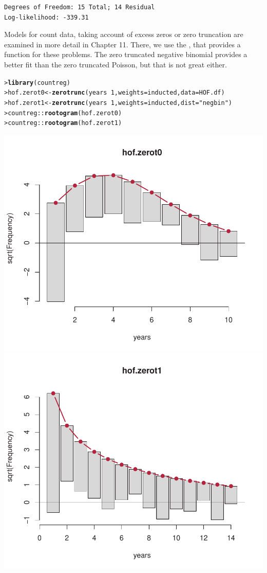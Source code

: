 \documentclass[10pt]{report}\usepackage[]{graphicx}\usepackage[]{color}
\makeatletter
\newcommand{\hlnum}[1]{\textcolor[rgb]{0.686,0.059,0.569}{#1}}%
\newcommand{\hlstr}[1]{\textcolor[rgb]{0.192,0.494,0.8}{#1}}%
\newcommand{\hlopt}[1]{\textcolor[rgb]{0,0,0}{#1}}%
\newcommand{\hlstd}[1]{\textcolor[rgb]{0.345,0.345,0.345}{#1}}%
\newcommand{\hlkwb}[1]{\textcolor[rgb]{0.69,0.353,0.396}{#1}}%
\newcommand{\hlkwc}[1]{\textcolor[rgb]{0.333,0.667,0.333}{#1}}%
\newcommand{\hlkwd}[1]{\textcolor[rgb]{0.737,0.353,0.396}{\textbf{#1}}}%
\newenvironment{kframe}{%
 \def\at@end@of@kframe{}%
 \ifinner\ifhmode%
  \def\at@end@of@kframe{\end{minipage}}%
  \begin{minipage}{\columnwidth}%
 \fi\fi%
 \def\FrameCommand##1{\hskip\@totalleftmargin \hskip-\fboxsep
 \colorbox{shadecolor}{##1}\hskip-\fboxsep
     \hskip-\linewidth \hskip-\@totalleftmargin \hskip\columnwidth}%
 \MakeFramed {\advance\hsize-\width
   \@totalleftmargin\z@ \linewidth\hsize
   \@setminipage}}%
 {\par\unskip\endMakeFramed%
 \at@end@of@kframe}
\newenvironment{knitrout}{}{} %
\renewenvironment{knitrout}{\small\renewcommand{\baselinestretch}{.85}}{} %
\makeatother
\begin{document}
\begin{Exercises}
\begin{enumerate*}
\begin{ans}
\begin{knitrout}
\begin{kframe}
\begin{verbatim}
Degrees of Freedom: 15 Total; 14 Residual
Log-likelihood: -339.31 
\end{verbatim}
\end{kframe}
\end{knitrout}
      Models for count data, taking account of excess zeros or zero truncation are examined in more detail
      in Chapter 11.  There, we use the , that provides a  function for these
      problems.  The zero truncated negative binomial provides a better fit than the zero truncated Poisson,
      but that is not great either.
\begin{knitrout}\footnotesize
{}\color{fgcolor}\begin{kframe}
\begin{alltt}
\hlstd{> }\hlkwd{library}\hlstd{(countreg)}
\hlstd{> }\hlstd{hof.zerot0} \hlkwb{<-} \hlkwd{zerotrunc}\hlstd{(years} \hlopt{~} \hlnum{1}\hlstd{,} \hlkwc{weights} \hlstd{= inducted,} \hlkwc{data}\hlstd{=HOF.df)}
\hlstd{> }\hlstd{hof.zerot1} \hlkwb{<-} \hlkwd{zerotrunc}\hlstd{(years} \hlopt{~} \hlnum{1}\hlstd{,} \hlkwc{weights} \hlstd{= inducted,} \hlkwc{dist}\hlstd{=}\hlstr{"negbin"}\hlstd{)}
\hlstd{> }\hlstd{countreg}\hlopt{::}\hlkwd{rootogram}\hlstd{(hof.zerot0)}
\hlstd{> }\hlstd{countreg}\hlopt{::}\hlkwd{rootogram}\hlstd{(hof.zerot1)}
\end{alltt}
\end{kframe}

\centerline{\includegraphics[width=.5\textwidth]{soln/fig/ex3_12d-1} 
\includegraphics[width=.5\textwidth]{soln/fig/ex3_12d-2} }



\end{knitrout}

      \end{ans}
      

    \end{enumerate*}


\end{Exercises}
\end{document}
